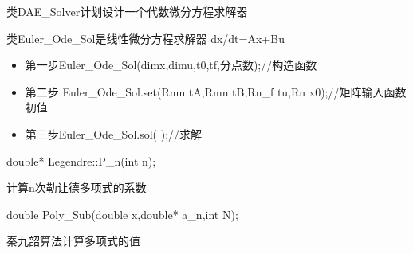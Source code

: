 \documentclass[a4]{ctexart}
\begin{document}
类DAE\_Solver计划设计一个代数微分方程求解器

类Euler\_Ode\_Sol是线性微分方程求解器
dx/dt=Ax+Bu

\begin{itemize}
\item 第一步Euler\_Ode\_Sol(dimx,dimu,t0,tf,分点数);//构造函数
\item 第二步 Euler\_Ode\_Sol.set(Rmn tA,Rmn tB,Rn\_f tu,Rn x0);//矩阵输入函数初值
\item 第三步Euler\_Ode\_Sol.sol( );//求解
\end{itemize}




double*  Legendre::P\_n(int n);

计算n次勒让德多项式的系数

double Poly\_Sub(double x,double* a\_n,int N);

秦九韶算法计算多项式的值
\end{document}
